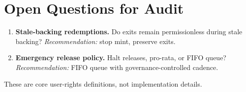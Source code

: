 \section{Open Questions for Audit}

\label{sec:open}

\begin{enumerate}
  \item \textbf{Stale-backing redemptions.} Do exits remain permissionless during stale backing? \emph{Recommendation:} stop mint, preserve exits.
  \item \textbf{Emergency release policy.} Halt releases, pro-rata, or FIFO queue? \emph{Recommendation:} FIFO queue with governance-controlled cadence.
\end{enumerate}

These are core user-rights definitions, not implementation details.



